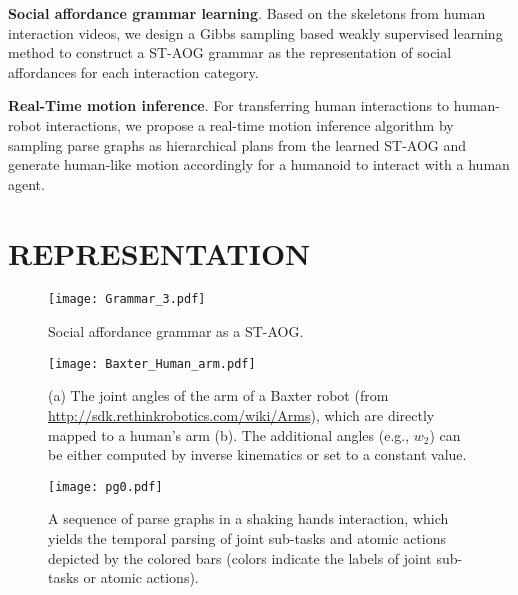 \documentclass[letterpaper, 10 pt, conference]{ieeeconf}  %
\begin{document}
\textbf{Social affordance grammar learning}. Based on the skeletons from human interaction videos, we design a Gibbs sampling based weakly supervised learning method to construct a ST-AOG grammar as the representation of social affordances for each interaction category.

\textbf{Real-Time motion inference}. For transferring human interactions to human-robot interactions, we propose a real-time motion inference algorithm by sampling parse graphs as hierarchical plans from the learned ST-AOG and generate human-like motion accordingly for a humanoid to interact with a human agent.






\section{REPRESENTATION}

   \begin{figure}[t!]
      \centering
      \texttt{[image: Grammar\_3.pdf]}
      \vspace{-5pt}
      \caption{Social affordance grammar as a ST-AOG.}
      \vspace{-10pt}
      \label{fig:rep}
   \end{figure}
   
    \begin{figure}[t!]
      \centering
      \texttt{[image: Baxter\_Human\_arm.pdf]}
      \vspace{-10pt}
      \caption[Caption for LOF]{(a) The joint angles of the arm of a Baxter robot (from \href{http://sdk.rethinkrobotics.com/wiki/Arms}{http://sdk.rethinkrobotics.com/wiki/Arms}), which are directly mapped to a human's arm (b). The additional angles (e.g., $w_2$) can be either computed by inverse kinematics or set to a constant value.}
      \vspace{-10pt}
      \label{fig:jointangles}
   \end{figure}
   
   \begin{figure*}[t!]
      \centering
      \texttt{[image: pg0.pdf]}
      \vspace{-10pt}
      \caption{A sequence of parse graphs in a shaking hands interaction, which yields the temporal parsing of joint sub-tasks and atomic actions depicted by the colored bars (colors indicate the labels of joint sub-tasks or atomic actions).}
      \vspace{-10pt}
      \label{fig:pg}
   \end{figure*}
\end{document}
